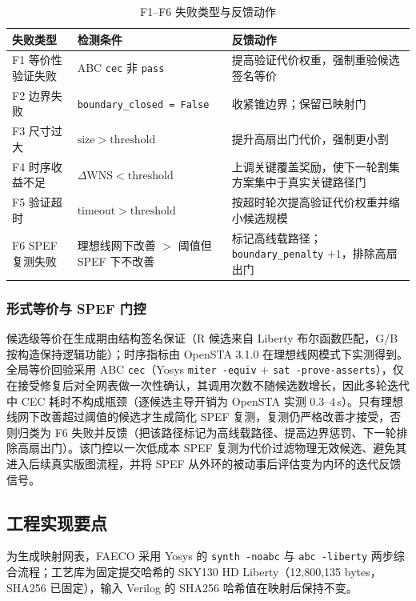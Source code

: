 \documentclass[journal]{IEEEtran}
\begin{document}
\begin{table}[!t]
\centering
\caption{F1--F6 失败类型与反馈动作}
\label{tab:failures}
\scriptsize
\setlength{\tabcolsep}{2pt}
\begin{tabular}{p{2.0cm}p{3.2cm}p{2.9cm}}
\toprule
\textbf{失败类型} & \textbf{检测条件} & \textbf{反馈动作} \\
\midrule
F1 等价性验证失败 & ABC \texttt{cec} 非 \texttt{pass} & 提高验证代价权重，强制重验候选签名等价 \\
F2 边界失败 & \texttt{boundary\_closed = False} & 收紧锥边界；保留已映射门 \\
F3 尺寸过大 & $\mathrm{size} > \mathrm{threshold}$ & 提升高扇出门代价，强制更小割 \\
F4 时序收益不足 & $\Delta\mathrm{WNS} < \mathrm{threshold}$ & 上调关键覆盖奖励，使下一轮割集方案集中于真实关键路径门 \\
F5 验证超时 & $\mathrm{timeout} > \mathrm{threshold}$ & 按超时轮次提高验证代价权重并缩小候选规模 \\
F6 SPEF 复测失败 & 理想线网下改善 $>$ 阈值但 SPEF 下不改善 & 标记高线载路径；\texttt{boundary\_penalty} $+1$，排除高扇出门 \\
\bottomrule
\end{tabular}
\end{table}

\subsubsection{形式等价与 SPEF 门控}
候选级等价在生成期由结构签名保证（R 候选来自 Liberty 布尔函数匹配，G/B 按构造保持逻辑功能）；时序指标由 OpenSTA 3.1.0 在理想线网模式下实测得到。全局等价回验采用 ABC \texttt{cec}（Yosys \texttt{miter -equiv} + \texttt{sat -prove-asserts}），仅在接受修复后对全网表做一次性确认，其调用次数不随候选数增长，因此多轮迭代中 CEC 耗时不构成瓶颈（逐候选主导开销为 OpenSTA 实测 $0.3$--$4\,$s）。只有理想线网下改善超过阈值的候选才生成简化 SPEF 复测，复测仍严格改善才接受，否则归类为 F6 失败并反馈（把该路径标记为高线载路径、提高边界惩罚、下一轮排除高扇出门）。该门控以一次低成本 SPEF 复测为代价过滤物理无效候选、避免其进入后续真实版图流程，并将 SPEF 从外环的被动事后评估变为内环的迭代反馈信号。

\subsection{工程实现要点}\label{sec:impl}

为生成映射网表，FAECO 采用 Yosys 的 \texttt{synth -noabc} 与 \texttt{abc -liberty} 两步综合流程；工艺库为固定提交哈希的 SKY130 HD Liberty（12,800,135 bytes，SHA256 已固定），输入 Verilog 的 SHA256 哈希值在映射后保持不变。
\end{document}
